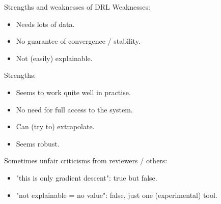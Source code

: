 \documentclass{beamer}
\begin{document}
\begin{frame}{Strengths and weaknesses of DRL}
Weaknesses:

\begin{itemize}
    \item Needs lots of data.
    \item No guarantee of convergence / stability.
    \item Not (easily) explainable.
\end{itemize}

Strengths:

\begin{itemize}
    \item Seems to work quite well in practise.
    \item No need for full access to the system.
    \item Can (try to) extrapolate.
    \item Seems robust.
\end{itemize}

Sometimes unfair criticisms from reviewers / others:

\begin{itemize}
    \item "this is only gradient descent": true but false.
    \item "not explainable = no value": false, just one (experimental) tool.
\end{itemize}

\end{frame}
\end{document}
